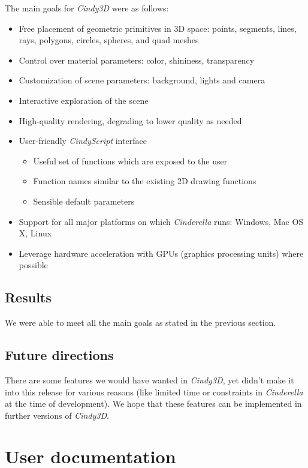 \documentclass{scrreprt}
\begin{document}
The main goals for \emph{Cindy3D} were as follows:
\begin{itemize}
\item Free placement of geometric primitives in 3D space: points, segments, 
lines, rays, polygons, circles, spheres, and quad meshes
\item Control over material parameters: color, shininess, transparency
\item Customization of scene parameters: background, lights and camera
\item Interactive exploration of the scene
\item High-quality rendering, degrading to lower quality as needed
\item User-friendly \emph{CindyScript} interface
	\begin{itemize}
	\item Useful set of functions which are exposed to the user
	\item Function names similar to the existing 2D drawing functions
	\item Sensible default parameters
	\end{itemize}
\item Support for all major platforms on which \emph{Cinderella} runs: 
Windows, Mac OS X, Linux
\item Leverage hardware acceleration with GPUs (graphics processing units) 
where possible
\end{itemize}

\section{Results}
We were able to meet all the main goals as stated in the previous section.

\section{Future directions}

There are some features we would have wanted in \emph{Cindy3D}, yet didn't make it into this release for various reasons (like limited time or constraints in \emph{Cinderella} at the time of development). We hope that these features can be implemented in further versions of \emph{Cindy3D}.

\chapter{User documentation}
\end{document}
